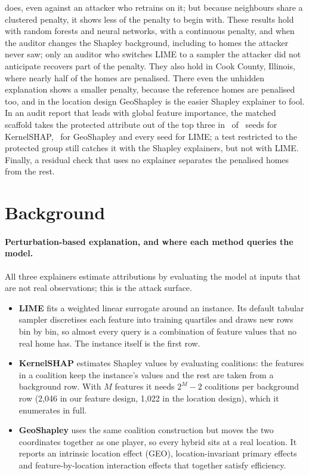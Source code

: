 \documentclass[11pt]{article}
\newcommand{\1}{\mathbf{1}}
\begin{document}
does, even against an attacker who retrains on it; but because neighbours share a clustered penalty, it shows less of
the penalty to begin with. These results hold with random forests and neural networks, with a continuous penalty, and when the auditor
changes the Shapley background, including to homes the attacker never saw; only an auditor who switches LIME to a
sampler the attacker did not anticipate recovers part of the penalty. They also hold in Cook County, Illinois, where
nearly half of the homes are penalised. There even the unhidden explanation shows a smaller penalty, because the
reference homes are penalised too, and in the location design GeoShapley is the easier Shapley explainer to fool. In
an audit report that leads with global feature importance, the matched scaffold takes the protected attribute out of
the top three in \AuditKernelSHAPMatPassN\ of \AuditKernelSHAPMatSeeds\ seeds for KernelSHAP,
\AuditGeoShapleyMatPassN\ for GeoShapley and every seed for LIME; a test restricted to the protected group still
catches it with the Shapley explainers, but not with LIME. Finally, a residual check that uses no explainer separates
the penalised homes from the rest.

\section{Background}

\paragraph{Perturbation-based explanation, and where each method queries the model.}
All three explainers estimate attributions by evaluating the model at inputs that are not real observations; this
is the attack surface.
\begin{itemize}
  \item \textbf{LIME} \citep{ribeiro2016lime} fits a weighted linear surrogate around an instance. Its default tabular
        sampler discretises each feature into training quartiles and draws new rows bin by bin, so almost every
        query is a combination of feature values that no real home has. The instance itself is the first row.
  \item \textbf{KernelSHAP} \citep{lundberg2017shap} estimates Shapley values by evaluating coalitions: the features in
        a coalition keep the instance's values and the rest are taken from a background row. With $M$ features it
        needs $2^M - 2$ coalitions per background row (2,046 in our feature design, 1,022 in the location design),
        which it enumerates in full.
  \item \textbf{GeoShapley} \citep{li2024geoshapley} uses the same coalition construction but moves the two coordinates
        together as one player, so every hybrid sits at a real location. It reports an intrinsic location effect
        (GEO), location-invariant primary effects and feature-by-location interaction effects that together satisfy
        efficiency.
\end{itemize}
\end{document}
